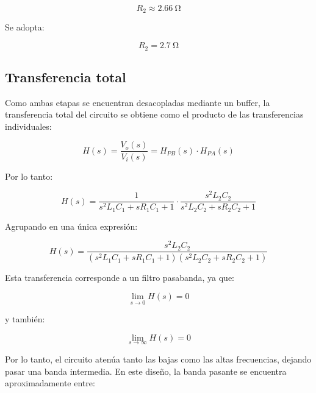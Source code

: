 \documentclass[12pt,a4paper]{article}
\begin{document}
\begin{equation}
    \boxed{
    R_2\approx \SI{2.66}{\ohm}
    }
    \label{eq:r2_resultado}
\end{equation}

Se adopta:

\begin{equation}
    \boxed{
    R_2=\SI{2.7}{\ohm}
    }
    \label{eq:r2_comercial}
\end{equation}

\subsection{Transferencia total}

Como ambas etapas se encuentran desacopladas mediante un buffer, la transferencia total del circuito se obtiene como el producto de las transferencias individuales:

\begin{equation}
    H(s)=\frac{V_o(s)}{V_i(s)}
    =
    H_{PB}(s)\cdot H_{PA}(s)
    \label{eq:h_total_producto}
\end{equation}

Por lo tanto:

\begin{equation}
    \boxed{
    H(s)=
    \frac{1}
    {s^2L_1C_1+sR_1C_1+1}
    \cdot
    \frac{s^2L_2C_2}
    {s^2L_2C_2+sR_2C_2+1}
    }
    \label{eq:h_total}
\end{equation}

Agrupando en una única expresión:

\begin{equation}
    \boxed{
    H(s)=
    \frac{s^2L_2C_2}
    {
    \left(s^2L_1C_1+sR_1C_1+1\right)
    \left(s^2L_2C_2+sR_2C_2+1\right)
    }
    }
    \label{eq:h_total_expandida}
\end{equation}

Esta transferencia corresponde a un filtro pasabanda, ya que:

\begin{equation}
    \lim_{s\to 0}H(s)=0
    \label{eq:limite_baja}
\end{equation}

y también:

\begin{equation}
    \lim_{s\to \infty}H(s)=0
    \label{eq:limite_alta}
\end{equation}

Por lo tanto, el circuito atenúa tanto las bajas como las altas frecuencias, dejando pasar una banda intermedia. En este diseño, la banda pasante se encuentra aproximadamente entre:
\end{document}

